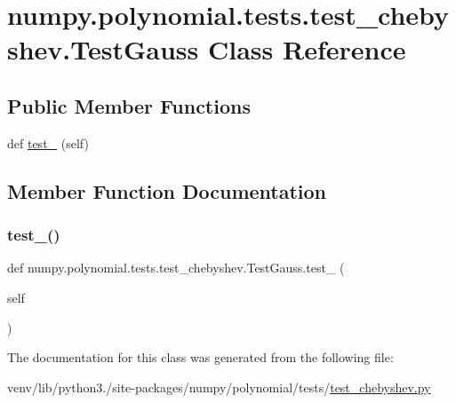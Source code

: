 \hypertarget{classnumpy_1_1polynomial_1_1tests_1_1test__chebyshev_1_1TestGauss}{}\section{numpy.\+polynomial.\+tests.\+test\+\_\+chebyshev.\+Test\+Gauss Class Reference}
\label{classnumpy_1_1polynomial_1_1tests_1_1test__chebyshev_1_1TestGauss}
\subsection*{Public Member Functions}
\begin{DoxyCompactItemize}
\item 
def \hyperlink{classnumpy_1_1polynomial_1_1tests_1_1test__chebyshev_1_1TestGauss_ac84b460d7b384edfded4e4b0d63d6344}{test\+\_} (self)
\end{DoxyCompactItemize}


\subsection{Member Function Documentation}
\mbox{\label{classnumpy_1_1polynomial_1_1tests_1_1test__chebyshev_1_1TestGauss_ac84b460d7b384edfded4e4b0d63d6344}} 
\subsubsection{\texorpdfstring{test\+\_()}{test\_100()}}
{\footnotesize\ttfamily def numpy.\+polynomial.\+tests.\+test\+\_\+chebyshev.\+Test\+Gauss.\+test\+\_ (\begin{DoxyParamCaption}\item[{}]{self }\end{DoxyParamCaption})}



The documentation for this class was generated from the following file\+:\begin{DoxyCompactItemize}
\item 
venv/lib/python3./site-\/packages/numpy/polynomial/tests/\hyperlink{test__chebyshev_8py}{test\+\_\+chebyshev.\+py}\end{DoxyCompactItemize}
